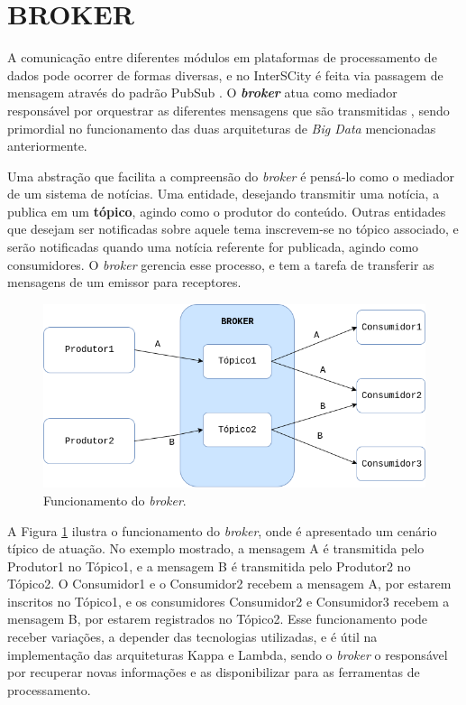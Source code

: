 \section{BROKER}

A comunicação entre diferentes módulos em plataformas de processamento de dados
pode ocorrer de formas diversas, e no InterSCity é feita via passagem de
mensagem através do padrão PubSub \cite{delesposte2017}.
O \textbf{\textit{broker}} atua como mediador responsável por orquestrar as diferentes
mensagens que são transmitidas \cite{marz2015}, sendo primordial no
funcionamento das duas arquiteturas de \textit{Big Data} mencionadas anteriormente.

Uma abstração que facilita a compreensão do \textit{broker} é pensá-lo como o
mediador de um sistema de notícias. Uma entidade, desejando transmitir
uma notícia, a publica em um \textbf{tópico}, agindo como o produtor do
conteúdo. Outras entidades que desejam ser notificadas sobre aquele tema
inscrevem-se no tópico associado, e serão notificadas quando uma notícia referente
for publicada, agindo como consumidores. O \textit{broker} gerencia esse
processo, e tem a tarefa de transferir as mensagens de um emissor para
receptores.

\begin{figure}
  \centering
    \includegraphics[scale=0.5]{figuras/broker.png}
    \caption{Funcionamento do \textit{broker}.}
  \label{fig:broker}
\end{figure}

A Figura \ref{fig:broker} ilustra o funcionamento do \textit{broker}, onde é
apresentado um cenário típico de atuação. No exemplo mostrado, a mensagem A
é transmitida pelo Produtor1 no Tópico1, e a mensagem B é transmitida pelo
Produtor2 no Tópico2. O Consumidor1 e o Consumidor2 recebem a mensagem A, por
estarem inscritos no Tópico1, e os consumidores Consumidor2 e Consumidor3
recebem a mensagem B, por estarem registrados no Tópico2. Esse funcionamento
pode receber variações, a depender das tecnologias utilizadas, e é útil
na implementação das arquiteturas Kappa e Lambda, sendo o
\textit{broker} o responsável por recuperar novas informações e as
disponibilizar para as ferramentas de processamento.

